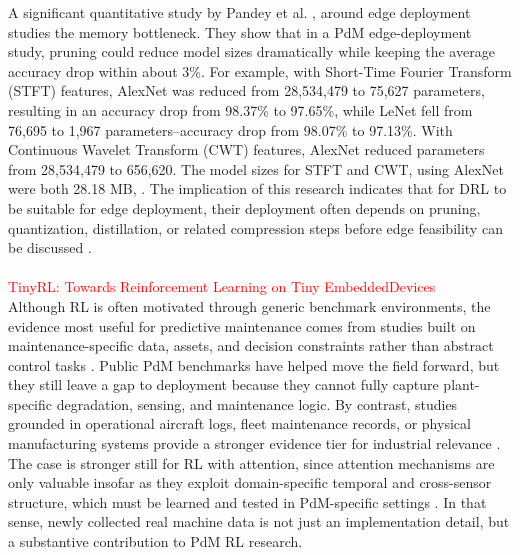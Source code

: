 \documentclass[sn-basic]{sn-jnl} %
\begin{document}

A significant quantitative study by Pandey et al. \cite{Pandey2023}, around edge deployment studies the memory bottleneck. They show that in a PdM edge-deployment study, pruning could reduce model sizes dramatically while keeping the average accuracy drop within about 3\%. For example, with Short-Time Fourier Transform (STFT) features, AlexNet was reduced from 28,534,479 to 75,627 parameters, resulting in an accuracy drop from 98.37\% to 97.65\%, while LeNet fell from 76,695 to 1,967 parameters--accuracy drop from 98.07\% to 97.13\%. With Continuous Wavelet Transform (CWT) features, AlexNet reduced parameters from 28,534,479 to 656,620. The model sizes for STFT and CWT, using AlexNet were both 28.18 MB, \cite{Pandey2023}. The implication of this research indicates that for DRL to be suitable for edge deployment, their deployment often depends on pruning, quantization, distillation, or related compression steps before edge feasibility can be discussed \cite{Pandey2023, Jang2020, Xu2022}.
\\
\\
\textcolor{red}{TinyRL: Towards Reinforcement Learning on Tiny EmbeddedDevices \cite{Szydlo2022}}\\

Although RL is often motivated through generic benchmark environments, the evidence most useful for predictive maintenance comes from studies built on maintenance-specific data, assets, and decision constraints rather than abstract control tasks \cite{Andrade2021Aircraft,Dangut2022RareFailure,Zhao2024,Siraskar2025}. Public PdM benchmarks have helped move the field forward, but they still leave a gap to deployment because they cannot fully capture plant-specific degradation, sensing, and maintenance logic. By contrast, studies grounded in operational aircraft logs, fleet maintenance records, or physical manufacturing systems provide a stronger evidence tier for industrial relevance \cite{Andrade2021Aircraft,Dangut2022RareFailure,Chen2024DigitalTwin}. The case is stronger still for RL with attention, since attention mechanisms are only valuable insofar as they exploit domain-specific temporal and cross-sensor structure, which must be learned and tested in PdM-specific settings \cite{Zhao2024}. In that sense, newly collected real machine data is not just an implementation detail, but a substantive contribution to PdM RL research.
\end{document}
